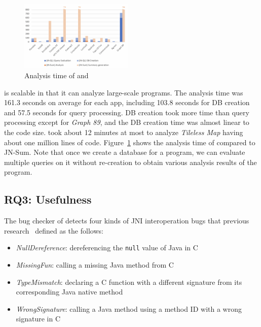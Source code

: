 \begin{figure}[t]
  \centering
  \vspace{2mm}
  \includegraphics[width=0.48\textwidth]{img/graph}
  \vspace*{-1.5em}
  \caption{Analysis time of \ours and \lees}
  \label{fig:graph}
\vspace*{-.5em}
\end{figure}

\ours is scalable in that it can analyze large-scale programs. The analysis
time was 161.3 seconds on average for each app, including 103.8 seconds
for DB creation and 57.5 seconds for query processing.  DB creation
took more time than query processing except for {\it Graph 89}, and
the DB creation time was almost linear to the code size. \ours took
about 12 minutes at most to analyze {\it Tileless Map} having about one million
lines of code. Figure~\ref{fig:graph} shows the analysis time of \ours
compared to JN-Sum.   Note
that once we create a database for a program, we can evaluate multiple queries on
it without re-creation to obtain various analysis results of the program.


\subsection{RQ3: Usefulness}

The bug checker of \ours detects four kinds of JNI interoperation bugs
that previous research~\cite{ILEA, LeeASE20} defined as the follows:


\begin{itemize}
  \item {\it NullDereference}: dereferencing the {\tt null} value of Java in C
  \item {\it MissingFun}: calling a missing Java method from C
  \item {\it TypeMismatch}: declaring a C function with a different signature
    from its corresponding Java native method
  \item {\it WrongSignature}: calling a Java method using a method ID with a
    wrong signature in C
\end{itemize}


